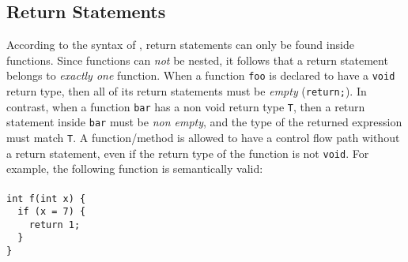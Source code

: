 \documentclass{article}
\begin{document}
\subsection{Return Statements}
\label{subsection_Return_Statements}
According to the syntax of \plname, return statements can only be found inside functions.
Since functions can \textit{not} be nested,
it follows that a return statement belongs to \textit{exactly one} function.
When a function \verb"foo" is declared to have a \verb"void" return type,
then all of its return statements must be \textit{empty} (\verb"return;").
In contrast, when a function \verb"bar" has a non void return type \verb"T",
then a return statement inside \verb"bar" must be \textit{non empty},
and the type of the returned expression must match \verb"T".
A function/method is allowed to have a control flow path without a return statement,
even if the return type of the function is not \verb"void".
For example, the following function is semantically valid:\\ \\
\verb"int f(int x) {" \\
\verb"  if (x = 7) {" \\
\verb"    return 1;" \\
\verb"  }"\\
\verb"}"\\

\end{document}
